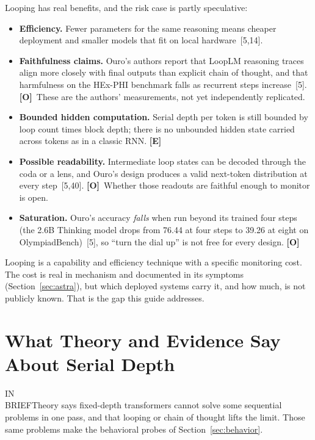 \documentclass[11pt,letterpaper]{article}
\newcommand{\inbrief}[1]{\begin{inbriefbox}IN\\BRIEF\tcblower #1\end{inbriefbox}}
\newcommand{\mO}{\textcolor{sensorteal}{\textbf{[O]}}}
\newcommand{\mE}{\textcolor{deepindigo}{\textbf{[E]}}}
\begin{document}
Looping has real benefits, and the risk case is partly speculative:
\begin{itemize}
  \item \textbf{Efficiency.} Fewer parameters for the same reasoning means cheaper deployment and smaller models that fit on local hardware~[5,14].
  \item \textbf{Faithfulness claims.} Ouro's authors report that LoopLM reasoning traces align more closely with final outputs than explicit chain of thought, and that harmfulness on the HEx-PHI benchmark falls as recurrent steps increase~[5]. \mO\ These are the authors' measurements, not yet independently replicated.
  \item \textbf{Bounded hidden computation.} Serial depth per token is still bounded by loop count times block depth; there is no unbounded hidden state carried across tokens as in a classic RNN. \mE
  \item \textbf{Possible readability.} Intermediate loop states can be decoded through the coda or a lens, and Ouro's design produces a valid next-token distribution at every step~[5,40]. \mO\ Whether those readouts are faithful enough to monitor is open.
  \item \textbf{Saturation.} Ouro's accuracy \emph{falls} when run beyond its trained four steps (the 2.6B Thinking model drops from 76.44 at four steps to 39.26 at eight on OlympiadBench)~[5], so ``turn the dial up'' is not free for every design. \mO
\end{itemize}

\begin{notebox}
Looping is a capability and efficiency technique with a specific monitoring cost. The cost is real in mechanism and documented in its symptoms (Section~\ref{sec:astra}), but which deployed systems carry it, and how much, is not publicly known. That is the gap this guide addresses.
\end{notebox}

\section{What Theory and Evidence Say About Serial Depth}
\label{sec:theory}

\inbrief{Theory says fixed-depth transformers cannot solve some sequential problems in one pass, and that looping or chain of thought lifts the limit. Those same problems make the behavioral probes of Section~\ref{sec:behavior}.}
\end{document}
